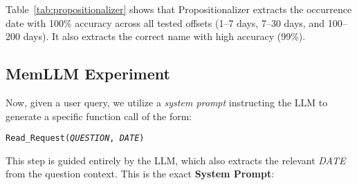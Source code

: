 \documentclass[11pt]{article}
\begin{document}
Table~\ref{tab:propositionalizer} shows that
Propositionalizer extracts the occurrence date
with 100\% accuracy across all tested offsets (1–7 days,
7–30 days, and 100–200 days). 
It also extracts the correct name with high accuracy (99\%).



\subsection{MemLLM Experiment}

Now, given a user query, we utilize a \emph{system prompt} instructing the LLM to generate a specific function call of the form:
\begin{center}
\texttt{Read\_Request(\textit{QUESTION}, \textit{DATE})}
\end{center}
This step is guided entirely by the LLM, which also extracts the relevant \textit{DATE} from the question context. This is the exact \textbf{System Prompt}:
\end{document}
